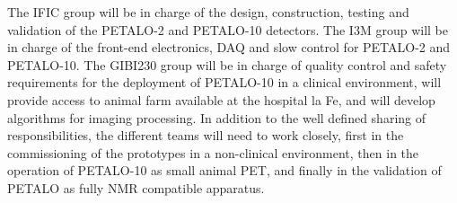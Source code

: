 The IFIC group will be in charge of the design, construction, testing and validation of the  PETALO-2 and PETALO-10 detectors. The I3M group will be in charge of the front-end electronics, DAQ and slow control for PETALO-2 and PETALO-10. The GIBI230 group
 will be in charge of quality control and safety requirements for the deployment of PETALO-10 in a clinical environment, will provide access to animal farm available at the hospital la Fe, and will develop algorithms for imaging processing. In addition to the well defined sharing of responsibilities, the different teams will need to work closely, first in the commissioning of the prototypes in a non-clinical environment, then in the operation of PETALO-10 as small animal PET, and finally in the validation of PETALO as fully NMR compatible apparatus.  
